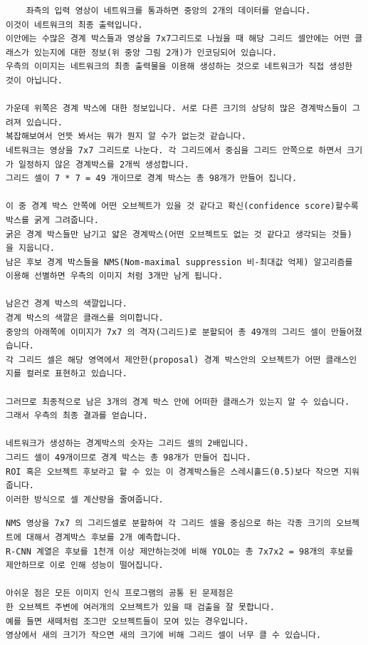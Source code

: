 \documentclass{article}
\begin{document}
\begin{verbatim}
    좌측의 입력 영상이 네트워크를 통과하면 중앙의 2개의 데이터를 얻습니다.
이것이 네트워크의 최종 출력입니다.
이안에는 수많은 경계 박스들과 영상을 7x7그리드로 나눴을 때 해당 그리드 셀안에는 어떤 클래스가 있는지에 대한 정보(위 중앙 그림 2개)가 인코딩되어 있습니다.
우측의 이미지는 네트워크의 최종 출력물을 이용해 생성하는 것으로 네트워크가 직접 생성한 것이 아닙니다.

가운데 위쪽은 경계 박스에 대한 정보입니다. 서로 다른 크기의 상당히 많은 경계박스들이 그려져 있습니다.
복잡해보여서 언뜻 봐서는 뭐가 뭔지 알 수가 없는것 같습니다.
네트워크는 영상을 7x7 그리드로 나눈다. 각 그리드에서 중심을 그리드 안쪽으로 하면서 크기가 일정하지 않은 경계박스를 2개씩 생성합니다.
그리드 셀이 7 * 7 = 49 개이므로 경계 박스는 총 98개가 만들어 집니다.
 
이 중 경계 박스 안쪽에 어떤 오브젝트가 있을 것 같다고 확신(confidence score)할수록 박스를 굵게 그려줍니다.
굵은 경계 박스들만 남기고 얇은 경계박스(어떤 오브젝트도 없는 것 같다고 생각되는 것들) 을 지웁니다.
남은 후보 경계 박스들을 NMS(Nom-maximal suppression 비-최대값 억제) 알고리즘를 이용해 선별하면 우측의 이미지 처럼 3개만 남게 됩니다.

남은건 경계 박스의 색깔입니다. 
경계 박스의 색깔은 클래스를 의미합니다. 
중앙의 아래쪽에 이미지가 7x7 의 격자(그리드)로 분할되어 총 49개의 그리드 셀이 만들어졌습니다.
각 그리드 셀은 해당 영역에서 제안한(proposal) 경계 박스안의 오브젝트가 어떤 클래스인지를 컬러로 표현하고 있습니다.

그러므로 최종적으로 남은 3개의 경계 박스 안에 어떠한 클래스가 있는지 알 수 있습니다.
그래서 우측의 최종 결과를 얻습니다.

네트워크가 생성하는 경계박스의 숫자는 그리드 셀의 2배입니다. 
그리드 셀이 49개이므로 경계 박스는 총 98개가 만들어 집니다.
ROI 혹은 오브젝트 후보라고 할 수 있는 이 경계박스들은 스레시홀드(0.5)보다 작으면 지워줍니다.
이러한 방식으로 셀 계산량을 줄여줍니다.
\end{verbatim}


\author{(3) 아쉬운 점}

\begin{verbatim}
NMS 영상을 7x7 의 그리드셀로 분할하여 각 그리드 셀을 중심으로 하는 각종 크기의 오브젝트에 대해서 경계박스 후보를 2개 예측합니다.
R-CNN 계열은 후보를 1천개 이상 제안하는것에 비해 YOLO는 총 7x7x2 = 98개의 후보를 제안하므로 이로 인해 성능이 떨어집니다. 

아쉬운 점은 모든 이미지 인식 프로그램의 공통 된 문제점은 
한 오브젝트 주변에 여러개의 오브젝트가 있을 때 검출을 잘 못합니다.
예를 들면 새떼처럼 조그만 오브젝트들이 모여 있는 경우입니다.
영상에서 새의 크기가 작으면 새의 크기에 비해 그리드 셀이 너무 클 수 있습니다.


\end{verbatim}



\end{document}
